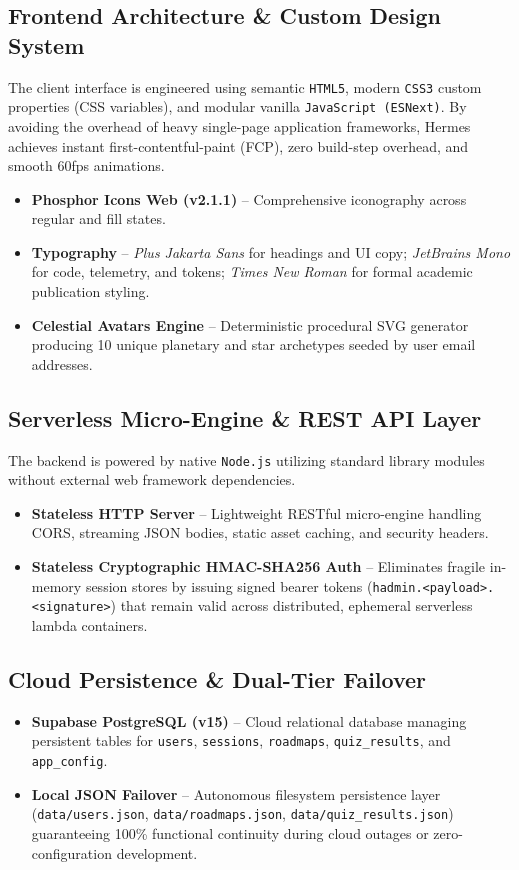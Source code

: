\documentclass[12pt,a4paper]{article}
\begin{document}
\subsection{Frontend Architecture \& Custom Design System}
The client interface is engineered using semantic \texttt{HTML5}, modern \texttt{CSS3} custom properties (CSS variables), and modular vanilla \texttt{JavaScript (ESNext)}. By avoiding the overhead of heavy single-page application frameworks, Hermes achieves instant first-contentful-paint (FCP), zero build-step overhead, and smooth 60fps animations.
\begin{itemize}[leftmargin=1.5em, itemsep=4pt]
    \item \textbf{Phosphor Icons Web (v2.1.1)} -- Comprehensive iconography across regular and fill states.
    \item \textbf{Typography} -- \textit{Plus Jakarta Sans} for headings and UI copy; \textit{JetBrains Mono} for code, telemetry, and tokens; \textit{Times New Roman} for formal academic publication styling.
    \item \textbf{Celestial Avatars Engine} -- Deterministic procedural SVG generator producing 10 unique planetary and star archetypes seeded by user email addresses.
\end{itemize}

\subsection{Serverless Micro-Engine \& REST API Layer}
The backend is powered by native \texttt{Node.js} utilizing standard library modules without external web framework dependencies.
\begin{itemize}[leftmargin=1.5em, itemsep=4pt]
    \item \textbf{Stateless HTTP Server} -- Lightweight RESTful micro-engine handling CORS, streaming JSON bodies, static asset caching, and security headers.
    \item \textbf{Stateless Cryptographic HMAC-SHA256 Auth} -- Eliminates fragile in-memory session stores by issuing signed bearer tokens (\texttt{hadmin.<payload>.<signature>}) that remain valid across distributed, ephemeral serverless lambda containers.
\end{itemize}

\subsection{Cloud Persistence \& Dual-Tier Failover}
\begin{itemize}[leftmargin=1.5em, itemsep=4pt]
    \item \textbf{Supabase PostgreSQL (v15)} -- Cloud relational database managing persistent tables for \texttt{users}, \texttt{sessions}, \texttt{roadmaps}, \texttt{quiz\_results}, and \texttt{app\_config}.
    \item \textbf{Local JSON Failover} -- Autonomous filesystem persistence layer (\texttt{data/users.json}, \texttt{data/roadmaps.json}, \texttt{data/quiz\_results.json}) guaranteeing 100\% functional continuity during cloud outages or zero-configuration development.
\end{itemize}
\end{document}
